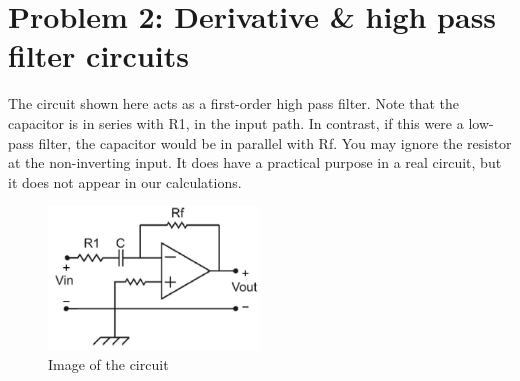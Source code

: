\documentclass[12pt, a4paper]{article}
\begin{document}
\section*{Problem 2: Derivative \& high pass filter circuits}
The circuit shown here acts as a first-order high pass filter. Note that the capacitor is in series with R1, in the input path. In contrast, if this were a low-pass filter, the capacitor would be in parallel with Rf. You may ignore the resistor at the non-inverting input. It does have a practical purpose in a real circuit, but it does not appear in our calculations.
\begin{figure}[H]
\centering
\includegraphics[width=0.5\textwidth]{circ1}
\caption{Image of the circuit}
\end{figure}
\end{document}

